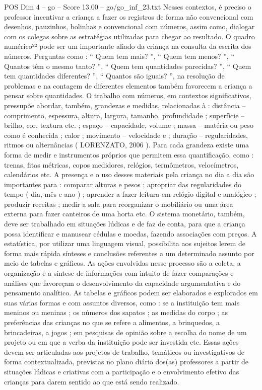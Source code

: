 \begin{textsample}{POS Dim 4 – go – Score 13.00 – go/go\_inf\_23.txt}
Nesses contextos, é preciso o professor incentivar a criança a fazer os registros de forma não convencional com desenhos, pauzinhos, bolinhas e convencional com números, assim como, dialogar com os colegas sobre as estratégias utilizadas para chegar ao resultado.
O quadro numérico²² pode ser um importante aliado da criança na consulta da escrita dos números.
Perguntas como : “ Quem tem mais? ”, “ Quem tem menos? ”, “ Quantos têm o mesmo tanto? ”, “ Quem tem quantidades parecidas? ”, “ Quem tem quantidades diferentes? ”, “ Quantos são iguais? ”, na resolução de problemas e na contagem de diferentes elementos também favorecem a criança a pensar sobre quantidades.
O trabalho com números, em contextos significativos, pressupõe abordar, também, grandezas e medidas, relacionadas à : distância – comprimento, espessura, altura, largura, tamanho, profundidade ; superfície – brilho, cor, textura etc. ; espaço – capacidade, volume ; massa – matéria ou peso como é conhecida ; calor ; movimento – velocidade e ; duração – regularidades, ritmos ou alternâncias ( LORENZATO, 2006 ).
Para cada grandeza existe uma forma de medir e instrumentos próprios que permitem essa quantificação, como : trenas, fitas métricas, copos medidores, relógios, termômetros, velocímetros, calendários etc.
A presença e o uso desses materiais pela criança no dia a dia são importantes para : comparar alturas e pesos ; apropriar das regularidades do tempo ( dia, mês e ano ) ; aprender a fazer leitura em relógio digital e analógico ; produzir receitas ; medir a sala para reorganizar o mobiliário ou uma área externa para fazer canteiros de uma horta etc.
O sistema monetário, também, deve ser trabalhado em situações lúdicas e de faz de conta, para que a criança possa identificar e manusear cédulas e moedas, fazendo associações com preços.
A estatística, por utilizar uma linguagem visual, possibilita aos sujeitos lerem de forma mais rápida sínteses e conclusões referentes a um determinado assunto por meio de tabelas e gráficos.
As ações envolvidas nesse processo são a coleta, a organização e a síntese de informações com intuito de fazer comparações e análises que favoreçam o desenvolvimento da capacidade argumentativa e do pensamento analítico.
As tabelas e gráficos podem ser elaborados e explorados em suas várias formas e com assuntos diversos, como : se a instituição tem mais meninos ou meninas ; os números dos sapatos ; as medidas do corpo ; as preferências das crianças no que se refere a alimentos, a brinquedos, a brincadeiras, a jogos ; em pesquisas de opinião sobre a escolha do nome de um projeto ou em que a verba da instituição pode ser investida etc.
Essas ações devem ser articuladas aos projetos de trabalho, temáticos ou investigativos de forma contextualizada, previstas no plano diário dos(as) professores a partir de situações lúdicas e criativas com a participação e o envolvimento efetivo das crianças para darem sentido ao que está sendo realizado.

\end{textsample}
